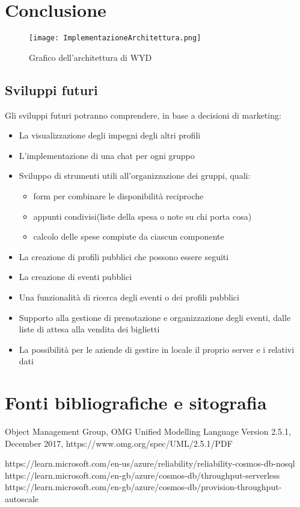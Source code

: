 \clearpage
\chapter*{Conclusione}

\begin{figure}[htbp]
    \begin{center}
        \texttt{[image: ImplementazioneArchitettura.png]}
        \caption{Grafico dell'architettura di WYD}
    \end{center}
\end{figure}
\clearpage

\section{Sviluppi futuri}
Gli sviluppi futuri potranno comprendere, in base a decisioni di marketing:
\begin{itemize}
    \item La visualizzazione degli impegni degli altri profili
    \item L'implementazione di una chat per ogni gruppo
    \item Sviluppo di strumenti utili all'organizzazione dei gruppi, quali:
          \begin{itemize}
              \item form per combinare le disponibilità reciproche
              \item appunti condivisi(liste della spesa o note su chi porta cosa)
              \item calcolo delle spese compiute da ciascun componente
          \end{itemize}
    \item La creazione di profili pubblici che possono essere seguiti
    \item La creazione di eventi pubblici
    \item Una funzionalità di ricerca degli eventi o dei profili pubblici
    \item Supporto alla gestione di prenotazione e organizzazione degli eventi, dalle liste di attesa alla vendita dei biglietti
    \item La possibilità per le aziende di gestire in locale il proprio server e i relativi dati
\end{itemize}
\clearpage

\chapter*{Fonti bibliografiche e sitografia}

Object Management Group, OMG Unified Modelling Language Version 2.5.1, December 2017, https://www.omg.org/spec/UML/2.5.1/PDF

https://learn.microsoft.com/en-us/azure/reliability/reliability-cosmos-db-nosql
https://learn.microsoft.com/en-gb/azure/cosmos-db/throughput-serverless
https://learn.microsoft.com/en-gb/azure/cosmos-db/provision-throughput-autoscale
